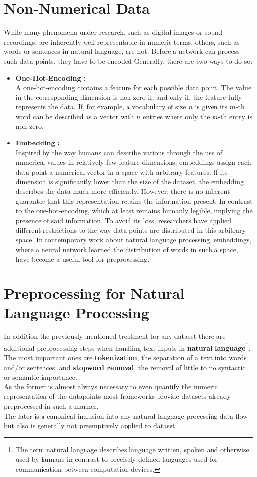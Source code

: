 \section{Non-Numerical Data}
While many phenomena under research, such as digital images or sound recordings, are inherently well representable in numeric terms, others, such as words or sentences in natural language, are not. Before a network can process such data points, they have to be encoded
Generally, there are two ways to do so:
\begin{itemize}
	\item \textbf{One-Hot-Encoding :}\\
	A one-hot-encoding contains a feature for each possible data point. The value in the corresponding dimension is non-zero if, and only if, the feature fully represents the data.
	If, for example, a vocabulary of size $n$ is given its $m$-th word can be described as a vector with $n$ entries where only the $m$-th entry is non-zero.\\
	\item \textbf{Embedding :}\\
	
	Inspired by the way humans can describe various through the use of numerical values in relatively few feature-dimensions, embeddings assign each data point a numerical vector in a space with arbitrary features. If its dimension is significantly lower than the size of the dataset, the embedding describes the data much more efficiently. However, there is no inherent guarantee that this representation retains the information present; In contrast to the one-hot-encoding, which at least remains humanly legible, implying the presence of said information. To avoid its loss, researchers have applied different restrictions to the way data points are distributed in this arbitrary space.
	In contemporary work about natural language processing, embeddings, where a neural network learned the distribution of words in such a space, have become a useful tool for preprocessing. \cite{Word2Vec}
\end{itemize} 

\section{Preprocessing for Natural Language Processing}
In addition the previously mentioned treatment for any dataset there are additional preprocessing steps when handling text-inputs in \textbf{natural language}\footnote{The term natural language describes language written, spoken and otherwise used by humans in contrast to precisely defined languages used for communication between computation devices.}. The most important ones are \textbf{tokenization}, the separation of a text into words and/or sentences, and \textbf{stopword removal}, the removal of little to no syntactic or semantic importance.\\
As the former is almost always necessary to even quantify the numeric representation of the datapoints most frameworks provide datasets already preprocessed in such a manner.\\
The later is a canonical inclusion into any natural-language-processing data-flow but also is generally not preemptively applied to dataset.